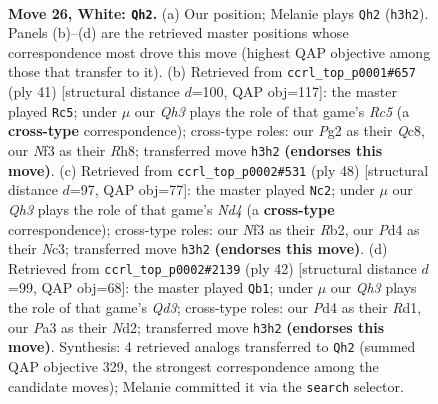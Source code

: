 \documentclass[11pt]{article}
\begin{document}
\begin{figure}[p]
\label{fig:thought-m48}
\end{figure}

\clearpage

\begin{figure}[p]\centering
\begin{subfigure}{0.46\textwidth}\centering
\resizebox{\linewidth}{!}{%
\newchessgame
\chessboard[
  setfen={rn2r1k1/2pnq2p/1p2p1p1/p3Pp2/3P1P1P/PR3NNQ/2PK2P1/7R w - - 0 26},
  showmover=false,
  pgfstyle=straightmove, color=movearrow, markmove={h3-h2}
]}
\caption{}
\end{subfigure}\hfill
\begin{subfigure}{0.46\textwidth}\centering
\resizebox{\linewidth}{!}{%
\newchessgame
\chessboard[
  setfen={2q1k2r/4pp2/pn1p1np1/1p4Np/2r1PN1P/5PP1/PPPQ4/1K1RR3 b k - 1 21},
  showmover=false,
  pgfstyle=straightmove, color=movearrow, markmove={c4-c5}
]}
\caption{}
\end{subfigure}
\\[4pt]
\begin{subfigure}{0.46\textwidth}\centering
\resizebox{\linewidth}{!}{%
\newchessgame
\chessboard[
  setfen={2r1r1k1/2q1npp1/pp1pp2p/2n5/P1PNPP1P/1PN2QP1/1R5K/3R4 w - - 5 25},
  showmover=false,
  pgfstyle=straightmove, color=movearrow, markmove={d4-c2}
]}
\caption{}
\end{subfigure}\hfill
\begin{subfigure}{0.46\textwidth}\centering
\resizebox{\linewidth}{!}{%
\newchessgame
\chessboard[
  setfen={5rk1/p1r1qpp1/1pp2n1p/3p2n1/1P1P4/P2QP2P/3NNPP1/2RR2K1 w - - 1 22},
  showmover=false,
  pgfstyle=straightmove, color=movearrow, markmove={d3-b1}
]}
\caption{}
\end{subfigure}
\caption{\textbf{Move 26, White: \texttt{Qh2}.} (a) Our position; Melanie plays \texttt{Qh2} (\texttt{h3h2}). Panels (b)--(d) are the retrieved master positions whose correspondence most drove this move (highest QAP objective among those that transfer to it). (b) Retrieved from \texttt{ccrl\_top\_p0001\#657} (ply 41) [structural distance $d$=100, QAP obj=117]: the master played \texttt{Rc5}; under $\mu$ our \emph{Qh3} plays the role of that game's \emph{Rc5} (a \textbf{cross-type} correspondence); cross-type roles: our \emph{P}g2 as their \emph{Q}c8, our \emph{N}f3 as their \emph{R}h8; transferred move \texttt{h3h2} \textbf{(endorses this move)}. (c) Retrieved from \texttt{ccrl\_top\_p0002\#531} (ply 48) [structural distance $d$=97, QAP obj=77]: the master played \texttt{Nc2}; under $\mu$ our \emph{Qh3} plays the role of that game's \emph{Nd4} (a \textbf{cross-type} correspondence); cross-type roles: our \emph{N}f3 as their \emph{R}b2, our \emph{P}d4 as their \emph{N}c3; transferred move \texttt{h3h2} \textbf{(endorses this move)}. (d) Retrieved from \texttt{ccrl\_top\_p0002\#2139} (ply 42) [structural distance $d$=99, QAP obj=68]: the master played \texttt{Qb1}; under $\mu$ our \emph{Qh3} plays the role of that game's \emph{Qd3}; cross-type roles: our \emph{P}d4 as their \emph{R}d1, our \emph{P}a3 as their \emph{N}d2; transferred move \texttt{h3h2} \textbf{(endorses this move)}. Synthesis: 4 retrieved analogs transferred to \texttt{Qh2} (summed QAP objective 329, the strongest correspondence among the candidate moves); Melanie committed it via the \texttt{search} selector.}

\end{figure}
\end{document}

